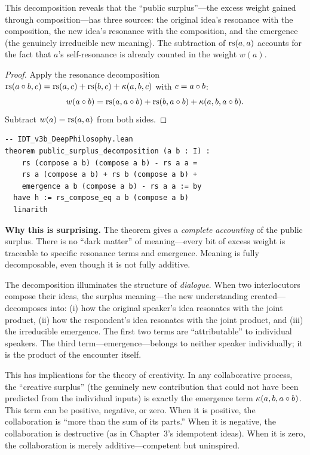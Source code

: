 This decomposition reveals that the ``public surplus''---the excess
weight gained through composition---has three sources: the original
idea's resonance with the composition, the new idea's resonance with
the composition, and the emergence (the genuinely irreducible new
meaning). The subtraction of $\mathrm{rs}(a,a)$ accounts for the fact that
$a$'s self-resonance is already counted in the weight $w(a)$.

\begin{proof}
Apply the resonance decomposition $\mathrm{rs}(a \circ b, c) =
\mathrm{rs}(a, c) + \mathrm{rs}(b, c) + \kappa(a, b, c)$ with $c = a \circ b$:
\[
w(a \circ b) = \mathrm{rs}(a, a \circ b) + \mathrm{rs}(b, a \circ b) +
\kappa(a, b, a \circ b).
\]
Subtract $w(a) = \mathrm{rs}(a, a)$ from both sides.
\end{proof}

\begin{lstlisting}
-- IDT_v3b_DeepPhilosophy.lean
theorem public_surplus_decomposition (a b : I) :
    rs (compose a b) (compose a b) - rs a a =
    rs a (compose a b) + rs b (compose a b) +
    emergence a b (compose a b) - rs a a := by
  have h := rs_compose_eq a b (compose a b)
  linarith
\end{lstlisting}

\begin{surprisebox}
\textbf{Why this is surprising.} The theorem gives a \emph{complete
accounting} of the public surplus. There is no ``dark matter'' of
meaning---every bit of excess weight is traceable to specific
resonance terms and emergence. Meaning is fully decomposable, even
though it is not fully additive.
\end{surprisebox}

The decomposition illuminates the structure of \emph{dialogue}. When
two interlocutors compose their ideas, the surplus meaning---the new
understanding created---decomposes into: (i) how the original speaker's
idea resonates with the joint product, (ii) how the respondent's idea
resonates with the joint product, and (iii) the irreducible emergence.
The first two terms are ``attributable'' to individual speakers. The
third term---emergence---belongs to neither speaker individually; it is
the product of the encounter itself.

This has implications for the theory of creativity. In any
collaborative process, the ``creative surplus'' (the genuinely new
contribution that could not have been predicted from the individual
inputs) is exactly the emergence term
$\kappa(a, b, a \circ b)$. This term can be positive, negative,
or zero. When it is positive, the collaboration is ``more than the sum
of its parts.'' When it is negative, the collaboration is destructive
(as in Chapter~3's idempotent ideas). When it is zero, the
collaboration is merely additive---competent but uninspired.

